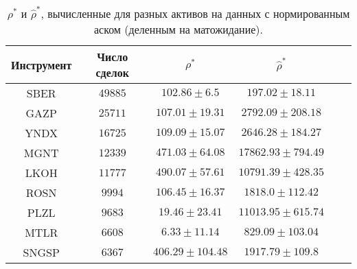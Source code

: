    \begin{table}[h!]
        \begin{center}
            \begin{tabular}{|c|c|c|c|c|c|}
                \hline
                Инструмент        & Число сделок & $\rho^*$ & $\hat \rho^*$ \\ \hline
                SBER & $49885$ & $102.86 \pm 6.5$ & $197.02 \pm 18.11$ \\ \hline 
                GAZP & $25711$ & $107.01 \pm 19.31$ & $2792.09 \pm 208.18$ \\ \hline 
                YNDX & $16725$ & $109.09 \pm 15.07$ & $2646.28 \pm 184.27$ \\ \hline 
                MGNT & $12339$ & $471.03 \pm 64.08$ & $17862.93 \pm 794.49$ \\ \hline 
                LKOH & $11777$ & $490.07 \pm 57.61$ & $10791.39 \pm 428.35$ \\ \hline 
                ROSN & $9994$ & $106.45 \pm 16.37$ & $1818.0 \pm 112.42$ \\ \hline 
                PLZL & $9683$ & $19.46 \pm 23.41$ & $11013.95 \pm 615.74$ \\ \hline 
                MTLR & $6608$ & $6.33 \pm 11.14$ & $829.09 \pm 103.04$ \\ \hline 
                SNGSP & $6367$ & $406.29 \pm 104.48$ & $1917.79 \pm 109.8$ \\ \hline 
    
            \end{tabular}
        \end{center}
        \caption{$\rho^*$ и $\hat \rho^*$, вычисленные для разных активов на данных с нормированным аском (деленным на матожидание).}
        \label{RD_SE_2}
        \end{table} 

    